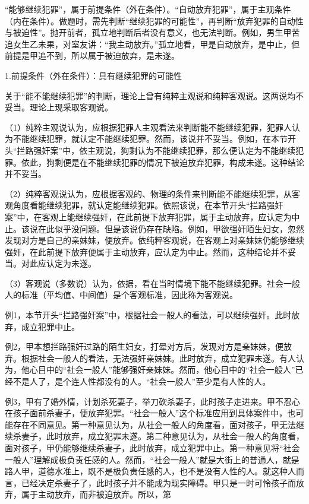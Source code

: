 “能够继续犯罪”，属于前提条件（外在条件）。“自动放弃犯罪”，属于主观条件（内在条件）。做题时，需先判断“继续犯罪的可能性”，再判断“放弃犯罪的自动性与被迫性”。抛开前者，孤立地判断后者没有意义，也无法判断。例如，男生甲苦追女生乙未果，对室友讲：“我主动放弃。”孤立地看，甲是自动放弃，是中止，但前提是甲追不到，所以属于被迫放弃，是未遂。

1.前提条件（外在条件）：具有继续犯罪的可能性

关于“能不能继续犯罪”的判断，理论上曾有纯粹主观说和纯粹客观说。这两说均不妥当。理论上现采取客观说。

（1）纯粹主观说认为，应根据犯罪人主观看法来判断能不能继续犯罪，犯罪人认为不能继续犯罪，就认定不能继续犯罪。然而，该说并不妥当。例如，在本节开头“拦路强奸案”中，依主观说，狗剩认为不能继续犯罪，那么便认定为不能继续犯罪。依此，狗剩便是在不能继续犯罪的情况下被迫放弃犯罪，构成未遂。这种结论并不妥当。

（2）纯粹客观说认为，应根据客观的、物理的条件来判断能不能继续犯罪，从客观角度看能继续犯罪，就认定能继续犯罪。依照该说，在本节开头“拦路强奸案”中，在客观上能继续强奸，在此前提下放弃犯罪，属于主动放弃，应认定为中止。该说在此似乎没问题。但是该说仍存在缺陷。例如，甲欲强奸陌生妇女，忽然发现对方是自己的亲妹妹，便放弃。依纯粹客观说，在客观上对亲妹妹仍能够继续强奸，在此前提下放弃便属于主动放弃，应认定为中止。然而，这种结论并不妥当。对此应认定为未遂。

（3）客观说（多数说）认为，依据，看在当时情境下能不能继续犯罪。社会一般人的标准（平均值、中间值）是个客观标准，因此称为客观说。

例1，本节开头“拦路强奸案”中，根据社会一般人的看法，可以继续强奸。此时放弃，成立犯罪中止。

例2，甲本想拦路强奸过路的陌生妇女，打晕对方后，发现对方是亲妹妹，便放弃。根据社会一般人的看法，无法强奸亲妹妹。此时放弃，成立犯罪未遂。有人认为，他心目中的“社会一般人”能够强奸亲妹妹。然而，他心目中的“社会一般人”已经不是人了，是个连人性都没有的人。“社会一般人”至少是有人性的人。

例3，甲有了婚外情，计划杀死妻子，举刀砍杀妻子，此时孩子走进来。甲不忍心在孩子面前杀妻子，便放弃犯罪。“社会一般人”这个标准应用到具体案件中，也可能存在不同意见。第一种意见认为，从社会一般人的角度看，面对孩子，甲无法继续杀妻子，此时放弃，成立犯罪未遂。第二种意见认为，从社会一般人的角度看，面对孩子，甲仍能够继续杀妻子，此时放弃，成立犯罪中止。第一种意见将“社会一般人”理解成极负责任感的人。然而，“社会一般人”就是大街上的普通人，就是路人甲，道德水准上，既不是极负责任感的人，也不是没有人性的人。就这种人而言，已经决定杀妻子了，此时孩子并不能成为现实障碍。甲只是一时可怜孩子而放弃，属于主动放弃，而非被迫放弃。所以，第

